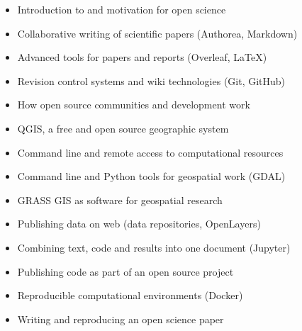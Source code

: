 \documentclass[25pt, margin=0mm, innermargin=25mm, blockverticalspace=25mm, colspace=25mm, subcolspace=8mm]{tikzposter}
\begin{document}
\begin{columns}
{\renewcommand{\labelitemi}{\textcolor{gray}{$\bullet$}\hspace{0.5ex}}

\begin{itemize}
 \item Introduction to and motivation for open science
 \item Collaborative writing of scientific papers (Authorea, Markdown)
 \item Advanced tools for papers and reports (Overleaf, LaTeX)
 \item Revision control systems and wiki technologies (Git, GitHub)
 \item How open source communities and development work
 \item QGIS, a free and open source geographic system
 \item Command line and remote access to computational resources
 \item Command line and Python tools for geospatial work (GDAL)
 \item GRASS GIS as software for geospatial research
 \item Publishing data on web (data repositories, OpenLayers)
 \item Combining text, code and results into one document (Jupyter)
 \item Publishing code as part of an open source project
 \item Reproducible computational environments (Docker)
 \item Writing and reproducing an open science paper
\end{itemize}

}


\end{columns}
\end{document}
